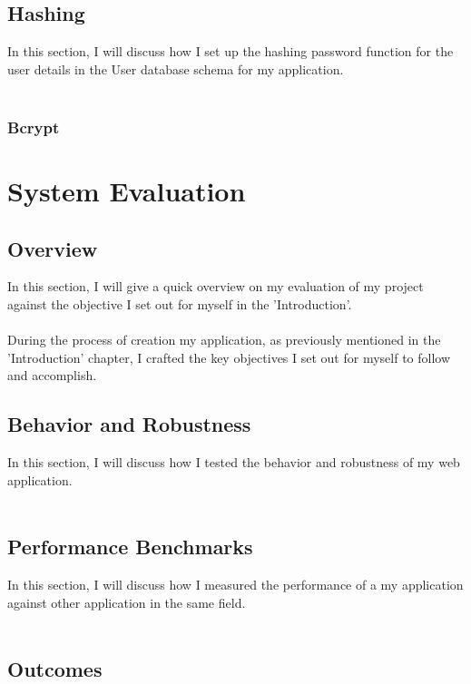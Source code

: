 \section{Hashing}

In this section, I will discuss how I set up the hashing password function for the user details in the User database schema for my application.\\ \\

\subsection{Bcrypt}

\chapter{System Evaluation}

\section{Overview}

In this section, I will give a quick overview on my evaluation of my project against the objective I set out for myself in the 'Introduction'.\\ \\
During the process of creation my application, as previously mentioned in the 'Introduction' chapter, I crafted the key objectives I set out for myself to follow and accomplish.

\section{Behavior and Robustness}

In this section, I will discuss how I tested the behavior and robustness of my web application.\\ \\

\section{Performance Benchmarks}

In this section, I will discuss how I measured the performance of a my application against other application in the same field.\\ \\

\section{Outcomes}

